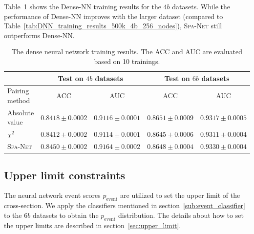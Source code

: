 \documentclass[12pt]{article}
\begin{document}
        Table~\ref{tab:DNN_training_results_1M_4b} shows the Dense-NN training results for the $4b$ datasets. While the performance of Dense-NN improves with the larger dataset (compared to Table~\ref{tab:DNN_training_results_500k_4b_256_nodes}), \textsc{Spa-Net} still outperforms Dense-NN.
        \begin{table}[htpb]
            \centering
            \caption{The dense neural network training results. The ACC and AUC are evaluated based on 10 trainings.}
            \label{tab:DNN_training_results_1M_4b}
            \begin{tabular}{l|cc|cc}
                             & \multicolumn{2}{c|}{Test on $4b$ datasets}& \multicolumn{2}{c}{Test on $6b$ datasets} \\ \hline
            Pairing method   & ACC                 & AUC                 & ACC                 & AUC                 \\ \hline
            Absolute value   & $0.8418 \pm 0.0002$ & $0.9116 \pm 0.0001$ & $0.8651 \pm 0.0009$ & $0.9317 \pm 0.0005$ \\
            $\chi^2$         & $0.8412 \pm 0.0002$ & $0.9114 \pm 0.0001$ & $0.8645 \pm 0.0006$ & $0.9311 \pm 0.0004$ \\
            \textsc{Spa-Net} & $0.8450 \pm 0.0002$ & $0.9164 \pm 0.0002$ & $0.8648 \pm 0.0004$ & $0.9330 \pm 0.0004$
            \end{tabular}
        \end{table}
    \subsection{Upper limit constraints}%
    \label{sub:upper_limit_constraints}
        The neural network event scores $p_{\text{event}}$ are utilized to set the upper limit of the cross-section. We apply the classifiers mentioned in section~\ref{sub:event_classifier} to the $6b$ datasets to obtain the $p_{\text{event}}$ distribution. The details about how to set the upper limits are described in section~\ref{sec:upper_limit}.
\end{document}
